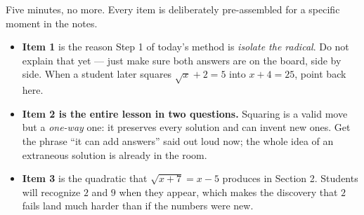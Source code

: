\documentclass[10pt]{article}
\begin{document}
\begin{teachernote}
\small Five minutes, no more. Every item is deliberately pre-assembled for a specific moment in the
notes.
\begin{itemize}[leftmargin=1.3em, nosep]
  \item \textbf{Item 1} is the reason Step 1 of today's method is \emph{isolate the radical}. Do not
        explain that yet --- just make sure both answers are on the board, side by side. When a
        student later squares $\sqrt{x}+2=5$ into $x+4=25$, point back here.
  \item \textbf{Item 2 is the entire lesson in two questions.} Squaring is a valid move but a
        \emph{one-way} one: it preserves every solution and can invent new ones. Get the phrase
        ``it can add answers'' said out loud now; the whole idea of an extraneous solution is
        already in the room.
  \item \textbf{Item 3} is the quadratic that $\sqrt{x+7}=x-5$ produces in Section 2. Students will
        recognize $2$ and $9$ when they appear, which makes the discovery that $2$ fails land much
        harder than if the numbers were new.
\end{itemize}
\end{teachernote}
\end{document}
